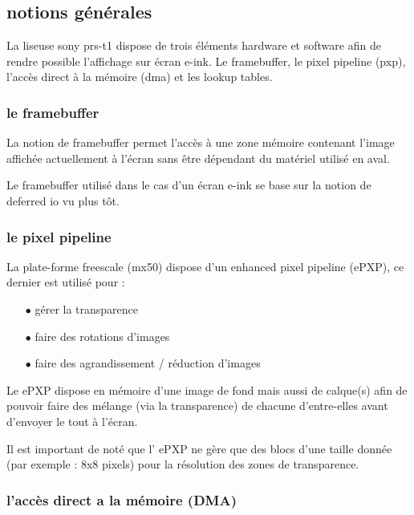 \subsection{notions générales}
La liseuse sony prs-t1 dispose de trois éléments hardware et software afin 
de rendre possible l'affichage sur écran e-ink. Le framebuffer, le pixel pipeline (pxp), l'accès direct à la mémoire (dma) et les lookup tables.

\subsubsection{le framebuffer}

La notion de framebuffer permet l'accès à une zone mémoire contenant l'image affichée actuellement à l'écran sans être dépendant  du matériel utilisé en aval.

Le framebuffer utilisé dans le cas d'un écran e-ink se base sur la notion de deferred io vu plus tôt.

\subsubsection{le pixel pipeline}

La plate-forme freescale (mx50) dispose d'un enhanced pixel pipeline (ePXP), ce dernier est utilisé pour : 
	\begin{itemize}
		\item[$\bullet$] gérer la transparence
		\item[$\bullet$] faire des rotations d'images
		\item[$\bullet$] faire des agrandissement / réduction d'images\\
	\end{itemize}

Le ePXP dispose en mémoire d'une image de fond mais aussi de calque(s) afin de pouvoir faire des 
mélange (via la transparence) de chacune d'entre-elles avant d'envoyer le tout à l'écran.

Il est important de noté que l' ePXP ne gère que des blocs d'une taille donnée (par exemple : 8x8 pixels) pour la résolution des zones de transparence.

\subsubsection{l'accès direct a la mémoire (DMA)}

